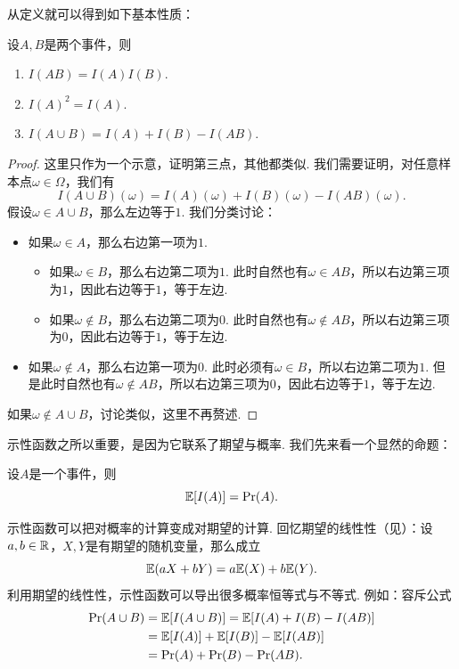 从定义就可以得到如下基本性质：
\begin{proposition}\label{prop:indicator-function}
    设$A, B$是两个事件，则
    \begin{enumerate}
        \item $I(AB) = I(A) I(B)$.
        \item $I(A)^2 = I(A)$.
        \item $I(A\cup B) = I(A) +I(B) - I(AB) $.
    \end{enumerate}
\end{proposition}
\begin{proof}
    这里只作为一个示意，证明第三点，其他都类似. 我们需要证明，对任意样本点$\omega\in\Omega$，我们有
    \[
        I(A\cup B)(\omega) = I(A)(\omega) + I(B)(\omega) - I(AB)(\omega).
    \]
    假设$\omega\in A\cup B$，那么左边等于$1$. 我们分类讨论：
    \begin{itemize}
        \item 如果$\omega\in A$，那么右边第一项为$1$.
        \begin{itemize}
            \item 如果$\omega\in B$，那么右边第二项为$1$. 此时自然也有$\omega\in AB$，所以右边第三项为$1$，因此右边等于$1$，等于左边. 
            \item 如果$\omega\notin B$，那么右边第二项为$0$. 此时自然也有$\omega\notin AB$，所以右边第三项为$0$，因此右边等于$1$，等于左边. 
        \end{itemize}
        \item 如果$\omega\notin A$，那么右边第一项为$0$. 此时必须有$\omega\in B$，所以右边第二项为$1$. 但是此时自然也有$\omega\notin AB$，所以右边第三项为$0$，因此右边等于$1$，等于左边. 
    \end{itemize}
    如果$\omega\notin A\cup B$，讨论类似，这里不再赘述. 
\end{proof}

示性函数之所以重要，是因为它联系了期望与概率. 我们先来看一个显然的命题：
\begin{proposition}\label{prop:expectation-of-indicator-function}
    设$A$是一个事件，则
    \[
        \mathbb{E}[I(A)] = \Pr(A).
    \]
\end{proposition}

示性函数可以把对概率的计算变成对期望的计算. 回忆期望的线性性（见）：设$a,b\in\mathbb{R}$，$X,Y$是有期望的随机变量，那么成立
\[\mathbb{E}(aX+bY)=a\mathbb{E}(X)+b\mathbb{E}(Y).\]
利用期望的线性性，示性函数可以导出很多概率恒等式与不等式. 例如：容斥公式
\begin{align*}
    \Pr(A\cup B) &= \mathbb{E}[I(A\cup B)] = \mathbb{E}[I(A) + I(B) - I(AB)] \\
    &= \mathbb{E}[I(A)] +  \mathbb{E}[I(B)] -  \mathbb{E}[I(AB)]\\
    &= \Pr(A) + \Pr(B) - \Pr(AB).
\end{align*}

